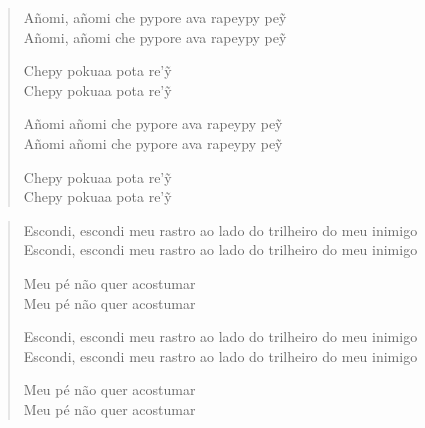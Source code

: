 \begin{verse}
Añomi, añomi che pypore ava rapeypy peỹ\\
Añomi, añomi che pypore ava rapeypy peỹ

Chepy pokuaa pota re'ỹ\\
Chepy pokuaa pota re'ỹ

Añomi añomi che pypore ava rapeypy peỹ\\
Añomi añomi che pypore ava rapeypy peỹ

Chepy pokuaa pota re'ỹ\\
Chepy pokuaa pota re'ỹ
\end{verse}

\begin{verse}
Escondi, escondi meu rastro ao lado do trilheiro do meu inimigo\\
Escondi, escondi meu rastro ao lado do trilheiro do meu inimigo

Meu pé não quer acostumar\\
Meu pé não quer acostumar

Escondi, escondi meu rastro ao lado do trilheiro do meu inimigo\\
Escondi, escondi meu rastro ao lado do trilheiro do meu inimigo

Meu pé não quer acostumar\\
Meu pé não quer acostumar
\end{verse}


